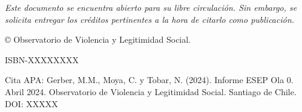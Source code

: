 \null\vfill
\begin{flushleft}
\thispagestyle{empty}
\textit{Este documento se encuentra abierto para su libre circulación. Sin embargo, se solicita entregar los créditos pertinentes a la hora de citarlo como publicación.}

© Observatorio de Violencia y Legitimidad Social. 

ISBN-XXXXXXXX

\noindent Cita APA: Gerber, M.M., Moya, C. y Tobar, N. (2024). Informe ESEP Ola 0. Abril 2024. Observatorio de Violencia y Legitimidad Social. Santiago de Chile. DOI: XXXXX

\end{flushleft}
